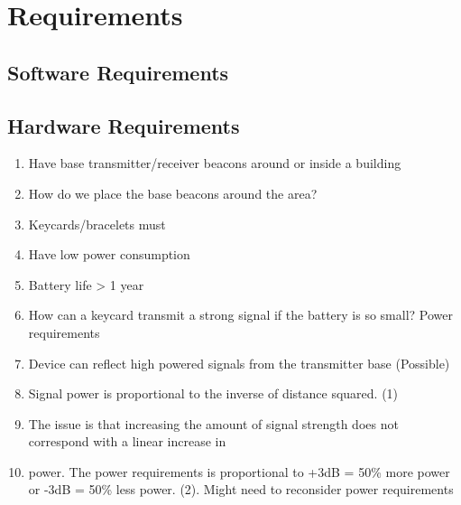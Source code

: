 \documentclass[12pt]{article}
\begin{document}
\section{Requirements}


\subsection{Software Requirements}

\subsection{Hardware Requirements}

	\begin{enumerate}
		\item Have base transmitter/receiver beacons around or inside a building
		\item How do we place the base beacons around the area?
		\item Keycards/bracelets must
		\item Have low power consumption
		\item Battery life > 1 year
		\item How can a keycard transmit a strong signal if the battery is so small? Power requirements
		\item Device can reflect high powered signals from the transmitter base (Possible)
		\item Signal power is proportional to the inverse of distance squared. (1)
		\item The issue is that increasing the amount of signal strength does not correspond with a linear increase in
		\item power. The power requirements is proportional to +3dB = 50\% more power or -3dB = 50\% less power. (2). Might need to reconsider power requirements
	\end{enumerate}
\end{document}
